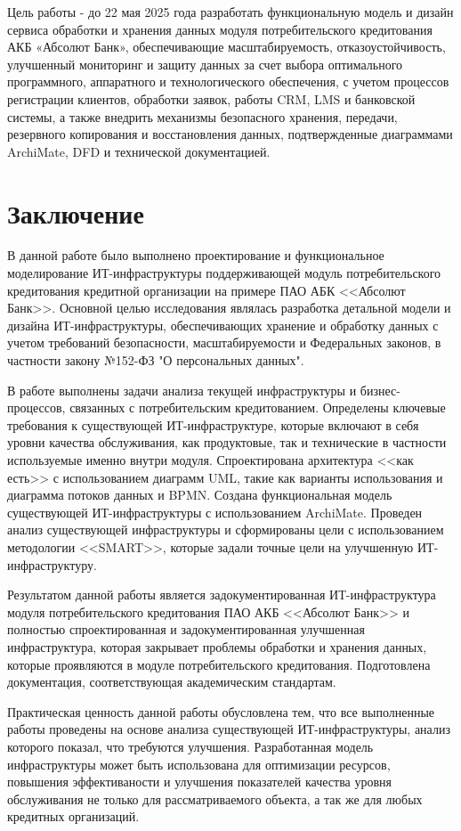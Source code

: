 \documentclass[14pt, a4paper]{extarticle}
\begin{document}
Цель работы - до 22 мая 2025 года разработать функциональную модель и
дизайн
сервиса
обработки и хранения данных модуля потребительского кредитования АКБ «Абсолют
Банк», обеспечивающие масштабируемость, отказоустойчивость, улучшенный
мониторинг и защиту данных за счет выбора оптимального программного,
аппаратного и технологического обеспечения, с учетом процессов регистрации
клиентов, обработки заявок, работы CRM, LMS и банковской системы, а также
внедрить механизмы безопасного хранения, передачи, резервного копирования и
восстановления данных, подтвержденные диаграммами ArchiMate, DFD\cite{dfd} и
технической документацией.

\section{Заключение}

В данной работе было выполнено проектирование и функциональное моделирование
ИТ-инфраструктуры поддерживающей модуль потребительского кредитования кредитной
организации на примере ПАО АБК <<Абсолют Банк>>. Основной целью
исследования являлась разработка детальной модели и дизайна ИТ-инфраструктуры,
обеспечивающих хранение и обработку данных с учетом требований безопасности,
масштабируемости и Федеральных законов, в частности закону №152-ФЗ "О
персональных данных".

В работе выполнены задачи анализа текущей инфраструктуры и бизнес-процессов,
связанных с потребительским кредитованием. Определены ключевые требования к
существующей ИТ-инфраструктуре, которые включают в себя уровни
качества обслуживания, как продуктовые, так и технические в частности
используемые именно внутри модуля. Спроектирована архитектура <<как есть>> с
использованием диаграмм UML, такие как варианты использования и диаграмма
потоков данных и BPMN. Создана функциональная модель существующей
ИТ-инфраструктуры с использованием ArchiMate. Проведен анализ существующей
инфраструктуры и сформированы цели с использованием методологии <<SMART>>,
которые задали точные цели на улучшенную ИТ-инфраструктуру.

Результатом данной работы является задокументированная ИТ-инфраструктура модуля
потребительского кредитования ПАО АКБ <<Абсолют Банк>> и полностью
спроектированная и задокументированная улучшенная инфраструктура, которая
закрывает проблемы обработки и хранения данных, которые проявляются в модуле
потребительского кредитования. Подготовлена документация, соответствующая
академическим стандартам.

Практическая ценность данной работы обусловлена тем, что все выполненные работы
проведены на основе анализа существующей ИТ-инфраструктуры, анализ которого
показал, что требуются улучшения. Разработанная модель инфраструктуры может
быть использована для оптимизации ресурсов, повышения эффективаности и
улучшения показателей качества уровня обслуживания не только для
рассматриваемого объекта, а так же для любых кредитных организаций.


\begingroup
\let\itshape\upshape
\sloppy
\raggedright
\printbibliography[title=СПИСОК ИСПОЛЬЗУЕМЫХ ИСТОЧНИКОВ]
{}
\endgroup
\end{document}
